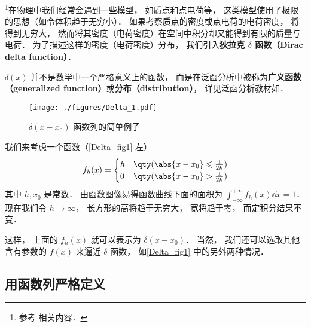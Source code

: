 
\footnote{参考 \cite{Arfken} 相关内容．}在物理中我们经常会遇到一些模型， 如质点和点电荷等， 这类模型使用了极限的思想（如令体积趋于无穷小）． 如果考察质点的密度或点电荷的电荷密度， 将得到无穷大， 然而将其密度（电荷密度）在空间中积分却又能得到有限的质量与电荷． 为了描述这样的密度（电荷密度）分布， 我们引入\textbf{狄拉克 $\delta$ 函数（Dirac delta function）}．

$\delta(x)$ 并不是数学中一个严格意义上的函数， 而是在泛函分析中被称为\textbf{广义函数（generalized function）}或\textbf{分布（distribution）}， 详见泛函分析教材如\cite{Zeidler}．

\begin{figure}[ht]
\centering
\texttt{[image: ./figures/Delta\_1.pdf]}
\caption{$\delta(x - x_0)$ 函数列的简单例子} \label{Delta_fig1}
\end{figure}

我们来考虑一个函数（\autoref{Delta_fig1} 左）
\begin{equation}\label{Delta_eq6}
f_h(x) =
\begin{cases}
h & \qty( \abs{x - x_0} \leqslant \frac{1}{2h} )\\
0 & \qty( \abs{x - x_0} > \frac{1}{2h} )
\end{cases}
\end{equation}
其中 $h, x_0$ 是常数． 由函数图像易得函数曲线下面的面积为 $\int_{-\infty}^{+\infty} f_h(x) \dd{x} = 1$． 现在我们令 $h \to \infty$， 长方形的高将趋于无穷大， 宽将趋于零， 而定积分结果不变．

这样， 上面的 $f_h(x)$ 就可以表示为 $\delta(x - x_0)$． 当然， 我们还可以选取其他含有参数的 $f(x)$ 来逼近 $\delta$ 函数， 如\autoref{Delta_fig1} 中的另外两种情况．

\subsection{用函数列严格定义}


